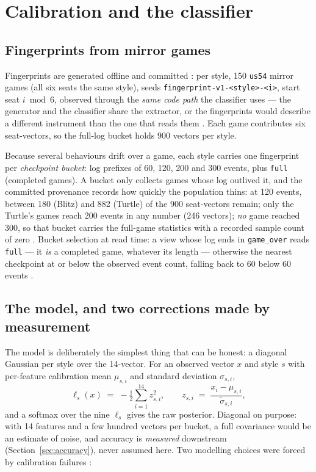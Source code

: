 \documentclass[11pt]{article}
\newcommand{\code}[1]{\texttt{#1}}
\newcommand{\usff}{\code{us54}}
\begin{document}
\section{Calibration and the classifier}
\label{sec:classifier}

\subsection{Fingerprints from mirror games}

Fingerprints are generated offline and committed \cite{fingerprints}: per style, 150 \usff{}
mirror games (all six seats the same style), seeds \code{fingerprint-v1-<style>-<i>}, start
seat $i \bmod 6$, observed through the \emph{same code path} the classifier uses --- the
generator and the classifier share the extractor, or the fingerprints would describe a
different instrument than the one that reads them \cite{repo}. Each game contributes six
seat-vectors, so the full-log bucket holds 900 vectors per style.

Because several behaviours drift over a game, each style carries one fingerprint per
\emph{checkpoint bucket}: log prefixes of 60, 120, 200 and 300 events, plus \code{full}
(completed games). A bucket only collects games whose log outlived it, and the committed
provenance records how quickly the population thins: at 120 events, between 180 (Blitz) and
882 (Turtle) of the 900 seat-vectors remain; only the Turtle's games reach 200 events in any
number (246 vectors); \emph{no} game reached 300, so that bucket carries the full-game
statistics with a recorded sample count of zero \cite{fingerprints}. Bucket selection at read
time: a view whose log ends in \code{game\_over} reads \code{full} --- it \emph{is} a
completed game, whatever its length --- otherwise the nearest checkpoint at or below the
observed event count, falling back to 60 below 60 events \cite{repo}.

\subsection{The model, and two corrections made by measurement}
\label{sec:corrections}

The model is deliberately the simplest thing that can be honest: a diagonal Gaussian per
style over the 14-vector. For an observed vector $x$ and style $s$ with per-feature
calibration mean $\mu_{s,i}$ and standard deviation $\sigma_{s,i}$,
\[
\ell_s(x) \;=\; -\tfrac12 \sum_{i=1}^{14} z_{s,i}^2,
\qquad
z_{s,i} \;=\; \frac{x_i - \mu_{s,i}}{\tilde\sigma_{s,i}},
\]
and a softmax over the nine $\ell_s$ gives the raw posterior. Diagonal on purpose: with 14
features and a few hundred vectors per bucket, a full covariance would be an estimate of
noise, and accuracy is \emph{measured} downstream (Section~\ref{sec:accuracy}), never assumed
here. Two modelling choices were forced by calibration failures \cite{repo}:
\end{document}
